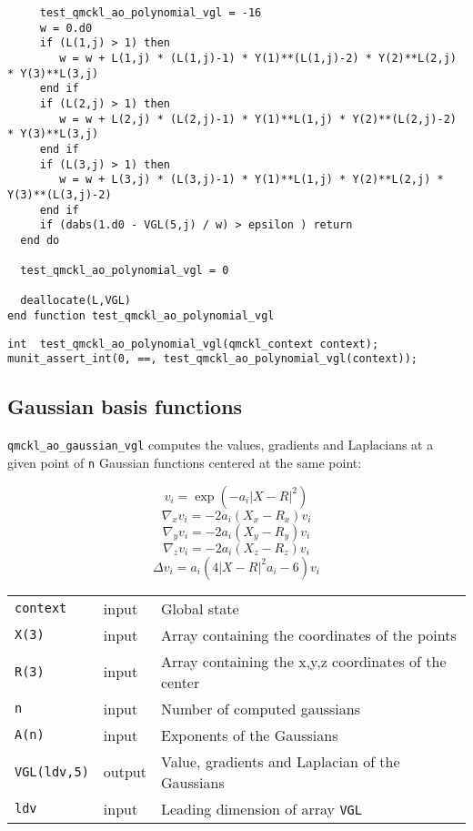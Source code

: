 \begin{verbatim}
     test_qmckl_ao_polynomial_vgl = -16
     w = 0.d0
     if (L(1,j) > 1) then
        w = w + L(1,j) * (L(1,j)-1) * Y(1)**(L(1,j)-2) * Y(2)**L(2,j) * Y(3)**L(3,j) 
     end if
     if (L(2,j) > 1) then
        w = w + L(2,j) * (L(2,j)-1) * Y(1)**L(1,j) * Y(2)**(L(2,j)-2) * Y(3)**L(3,j) 
     end if
     if (L(3,j) > 1) then
        w = w + L(3,j) * (L(3,j)-1) * Y(1)**L(1,j) * Y(2)**L(2,j) * Y(3)**(L(3,j)-2) 
     end if
     if (dabs(1.d0 - VGL(5,j) / w) > epsilon ) return
  end do

  test_qmckl_ao_polynomial_vgl = 0

  deallocate(L,VGL)
end function test_qmckl_ao_polynomial_vgl
\end{verbatim}

\begin{verbatim}
int  test_qmckl_ao_polynomial_vgl(qmckl_context context);
munit_assert_int(0, ==, test_qmckl_ao_polynomial_vgl(context));
\end{verbatim}

\subsection{Gaussian basis functions}
\label{sec:org29184a6}

\texttt{qmckl\_ao\_gaussian\_vgl} computes the values, gradients and
Laplacians at a given point of \texttt{n} Gaussian functions centered at
the same point:

\[ v_i = \exp(-a_i |X-R|^2) \]
\[ \nabla_x v_i = -2 a_i (X_x -  R_x) v_i \]
\[ \nabla_y v_i = -2 a_i (X_y -  R_y) v_i \]
\[ \nabla_z v_i = -2 a_i (X_z -  R_z) v_i \]
\[ \Delta v_i = a_i (4 |X-R|^2 a_i - 6) v_i \]

\begin{center}
\begin{tabular}{lll}
\texttt{context} & input & Global state\\
\texttt{X(3)} & input & Array containing the coordinates of the points\\
\texttt{R(3)} & input & Array containing the x,y,z coordinates of the center\\
\texttt{n} & input & Number of computed gaussians\\
\texttt{A(n)} & input & Exponents of the Gaussians\\
\texttt{VGL(ldv,5)} & output & Value, gradients and Laplacian of the Gaussians\\
\texttt{ldv} & input & Leading dimension of array \texttt{VGL}\\
\end{tabular}
\end{center}


